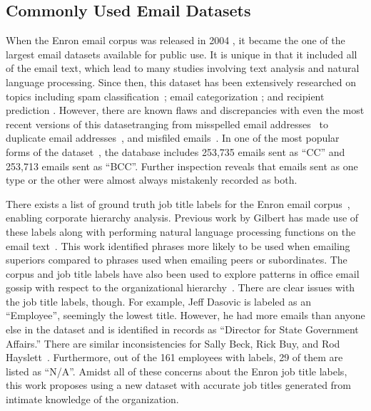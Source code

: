\documentclass[12pt]{report}
\begin{document}
\subsection{Commonly Used Email Datasets} \label{sec:Enron}
When the Enron email corpus was released in 2004 \cite{klimt_introducing_2004}, it became the one of the largest email datasets available for public use.
It is unique in that it included all of the email text, which lead to many studies involving text analysis and natural language processing. 
Since then, this dataset has been extensively researched on topics including spam classification~\cite{bahgat2016mail,shams_classifying_2013}; email categorization \cite{he_novel_2014,keila_structure_2005}; and recipient prediction \cite{sofershtein_predicting_2015,hu_towards_2012}.
However, there are known flaws and discrepancies with even the most recent versions of this dataset\textemdash{}ranging from misspelled email addresses~\cite{nordbo_data_2014} to duplicate email addresses~\cite{waterman_big_2014}, and misfiled emails~\cite{namata_inferring_2006}.
In one of the most popular forms of the dataset~\cite{shetty_enron_2004}, the database includes 253,735 emails sent as ``CC'' and  253,713 emails sent as ``BCC''.
Further inspection reveals that emails sent as one type or the other were almost always mistakenly recorded as both.

There exists a list of ground truth job title labels for the Enron email corpus~\cite{shetty_status_2004}, enabling corporate hierarchy analysis.
Previous work by Gilbert has made use of these labels along with performing natural language processing functions on the email text~\cite{gilbert_phrases_2012}.
This work identified phrases more likely to be used when emailing superiors compared to phrases used when emailing peers or subordinates.
The corpus and job title labels have also been used to explore patterns in office email gossip with respect to the organizational hierarchy~\cite{mitra_analyzing_2013}.
There are clear issues with the job title labels, though.
For example, Jeff Dasovic is labeled as an ``Employee'', seemingly the lowest title.
However, he had more emails than anyone else in the dataset and is identified in records as “Director for State Government Affairs.” 
There are similar inconsistencies for Sally Beck, Rick Buy, and Rod Hayslett~\cite{gilbert_phrases_2012}.
Furthermore, out of the 161 employees with labels, 29 of them are listed as ``N/A''.
Amidst all of these concerns about the Enron job title labels, this work proposes using a new dataset with accurate job titles generated from intimate knowledge of the organization.
\end{document}

